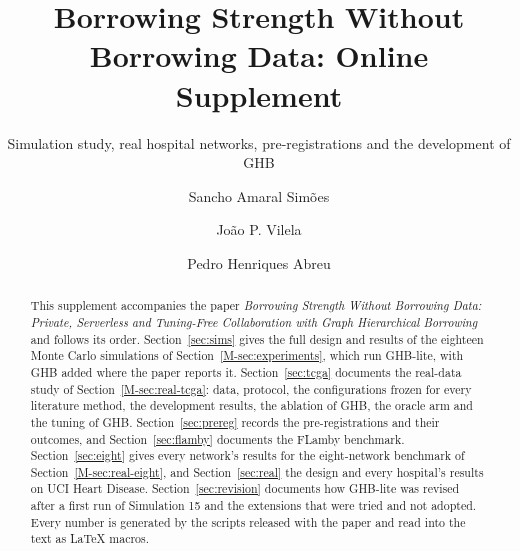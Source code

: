 \documentclass[acmsmall,screen,nonacm]{acmart}
\theoremstyle{acmdefinition}
\begin{document}
\title{Borrowing Strength Without Borrowing Data: Online Supplement}
\subtitle{Simulation study, real hospital networks, pre-registrations and the development of GHB}

\author{Sancho Amaral Sim\~{o}es}

\author{Jo\~{a}o P. Vilela}

\author{Pedro Henriques Abreu}

\begin{abstract}
This supplement accompanies the paper \emph{Borrowing Strength Without Borrowing Data: Private, Serverless and Tuning-Free Collaboration with Graph Hierarchical Borrowing} and follows its order. Section~\ref{sec:sims} gives the full design and results of the eighteen Monte Carlo simulations of Section~\ref{M-sec:experiments}, which run GHB-lite, with GHB added where the paper reports it. Section~\ref{sec:tcga} documents the real-data study of Section~\ref{M-sec:real-tcga}: data, protocol, the configurations frozen for every literature method, the development results, the ablation of GHB, the oracle arm and the tuning of GHB. Section~\ref{sec:prereg} records the pre-registrations and their outcomes, and Section~\ref{sec:flamby} documents the FLamby benchmark. Section~\ref{sec:eight} gives every network's results for the eight-network benchmark of Section~\ref{M-sec:real-eight}, and Section~\ref{sec:real} the design and every hospital's results on UCI Heart Disease. Section~\ref{sec:revision} documents how GHB-lite was revised after a first run of Simulation 15 and the extensions that were tried and not adopted. Every number is generated by the scripts released with the paper and read into the text as LaTeX macros.
\end{abstract}

\maketitle
\renewcommand{\shortauthors}{Sim\~{o}es et al.}

\end{document}
